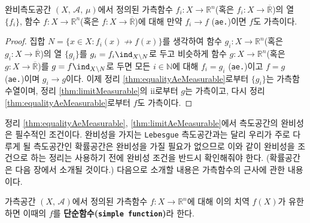 \begin{theorem}\label{thm:limitAeMeasurable}
    완비측도공간 $(X,\,\mathcal{A},\,\mu)$에서 정의된 가측함수 $f_i:X\to\mathbb{R}^n$(혹은 $f_i:X\to\overline{\mathbb{R}}$)의 열 $\{f_i\}$, 함수 $f:X\to\mathbb{R}^n$(혹은 $f:X\to\overline{\mathbb{R}}$)에 대해 만약 $f_i\to f$ (\texttt{ae.})이면 $f$도 가측이다.
\end{theorem}

\begin{proof}
    집합 $N=\{x\in X:f_i(x)\not\to f(x)\}$를 생각하여 함수 $g_i:X\to\mathbb{R}^n$(혹은 $g_i:X\to\overline{\mathbb{R}}$)의 열 $\{g_i\}$를 $g_i=f_i\ind_{X\setminus N}$로 두고 비슷하게 함수 $g:X\to\mathbb{R}^n$(혹은 $g:X\to\overline{\mathbb{R}}$)를 $g=f\ind_{X\setminus N}$로 두면 모든 $i\in\mathbb{N}$에 대해 $f_i=g_i$ (\texttt{ae.})이고 $f=g$ (\texttt{ae.})이며 $g_i\to g$이다. 이제 정리 \ref{thm:equalityAeMeasurable}로부터 $\{g_i\}$는 가측함수열이며, 정리 \ref{thm:limitMeasurable}의 ii로부터 $g$는 가측이고, 다시 정리 \ref{thm:equalityAeMeasurable}로부터 $f$도 가측이다.
\end{proof}

정리 \ref{thm:equalityAeMeasurable}, \ref{thm:limitAeMeasurable}에서 측도공간의 완비성은 필수적인 조건이다. 완비성을 가지는 \texttt{Lebesgue} 측도공간과는 달리 우리가 주로 다루게 될 측도공간인 확률공간은 완비성을 가질 필요가 없으므로 이와 같이 완비성을 조건으로 하는 정리는 사용하기 전에 완비성 조건을 반드시 확인해줘야 한다. (확률공간은 다음 장에서 소개될 것이다.) 다음으로 소개할 내용은 가측함수의 근사에 관한 내용이다.

\begin{definition}
    가측공간 $(X,\,\mathcal{A})$에서 정의된 가측함수 $f:X\to\mathbb{R}^n$에 대해 이의 치역 $f(X)$가 유한하면 이때의 $f$를 \textbf{단순함수(\texttt{simple function})}라 한다.
\end{definition}

